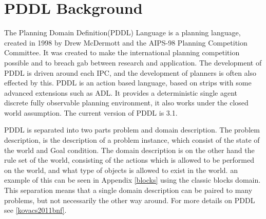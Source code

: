 \section{PDDL Background}
The Planning Domain Definition(PDDL) Language is a planning language, created in 1998 by Drew McDermott and the AIPS-98 Planning Competition Committee. It was created to make the international planning competition possible and to breach gab between research and application. The development of PDDL is driven around each IPC, and the development of planners is often also effected by this.
PDDL is an action based language, based on strips with some advanced extensions such as ADL. It provides a deterministic single agent discrete fully observable planning environment, it also works under the closed world assumption. The current version of PDDL is 3.1.

PDDL is separated into two parts problem and domain description. The problem description, is the description of a problem instance, which consist of the state of the world and Goal condition. The domain description is on the other hand the rule set of the world, consisting of the actions which is allowed to be performed on the world, and what type of objects is allowed to exist in the world. an example of this can be seen in Appendix \ref{blocks} using the classic blocks domain. This separation means that a single domain description can be paired to many problems, but not necessarily the other way around. For more details on PDDL see \ref{kovacs2011bnf}.
